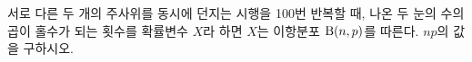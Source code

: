 서로 다른 두 개의 주사위를 동시에 던지는 시행을 100번 반복할 때, 나온 두 눈의 수의 곱이 홀수가 되는 횟수를 확률변수 $X$라 하면 $X$는 이항분포 $\mathrm{B}(n{,}\mkern3mu\mathopen{}p)$를 따른다. $np$의 값을 구하시오.
